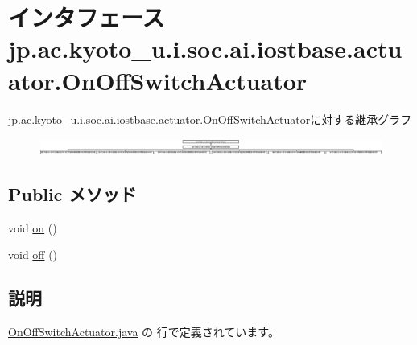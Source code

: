 \hypertarget{interfacejp_1_1ac_1_1kyoto__u_1_1i_1_1soc_1_1ai_1_1iostbase_1_1actuator_1_1_on_off_switch_actuator}{\section{インタフェース jp.\-ac.\-kyoto\-\_\-u.\-i.\-soc.\-ai.\-iostbase.\-actuator.\-On\-Off\-Switch\-Actuator}
\label{interfacejp_1_1ac_1_1kyoto__u_1_1i_1_1soc_1_1ai_1_1iostbase_1_1actuator_1_1_on_off_switch_actuator}
}
jp.\-ac.\-kyoto\-\_\-u.\-i.\-soc.\-ai.\-iostbase.\-actuator.\-On\-Off\-Switch\-Actuatorに対する継承グラフ\begin{figure}[H]
\begin{center}
\leavevmode
\includegraphics[height=0.555556cm]{interfacejp_1_1ac_1_1kyoto__u_1_1i_1_1soc_1_1ai_1_1iostbase_1_1actuator_1_1_on_off_switch_actuator}
\end{center}
\end{figure}
\subsection*{Public メソッド}
\begin{DoxyCompactItemize}
\item 
void \hyperlink{interfacejp_1_1ac_1_1kyoto__u_1_1i_1_1soc_1_1ai_1_1iostbase_1_1actuator_1_1_on_off_switch_actuator_ae8a7a45969693afae8233c7f07979078}{on} ()
\item 
void \hyperlink{interfacejp_1_1ac_1_1kyoto__u_1_1i_1_1soc_1_1ai_1_1iostbase_1_1actuator_1_1_on_off_switch_actuator_aba3964484e6d3ab0965659bd4ef54f59}{off} ()
\end{DoxyCompactItemize}


\subsection{説明}


 \hyperlink{_on_off_switch_actuator_8java_source}{On\-Off\-Switch\-Actuator.\-java} の  行で定義されています。



